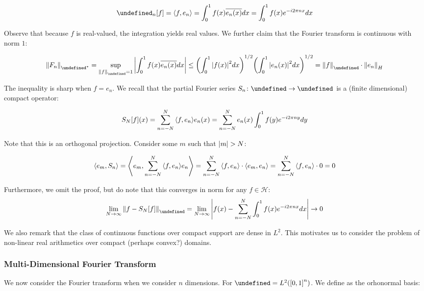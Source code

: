 \documentclass[12pt]{article}
\let\H\undefined
\newcommand{\H}{\mathcal{H}}
\let\F\undefined
\newcommand{\F}{\mathcal{F}}
\begin{document}
\begin{align*}
  \F_n\brackets{f}
    = \inner{f, e_n}
    = \int_0^1 f\parens{x} \overline{e_n \parens{x}} dx
    = \int_0^1 f\parens{x} e^{-i 2 \pi n x} dx
\end{align*}

Observe that because $f$ is real-valued, the integration yields real values.
We further claim that the Fourier transform is continuous with
norm $1$:

\begin{align*}
  \norm{F_n}_{\adj{\H}}
    = \sup_{\norm{f}_{\H} = 1}
        \abs{\int_0^1 f\parens{x} \overline{e_n \parens{x}} dx}
    \leq \parens{\int_0^1 \abs{f\parens{x}}^2 dx}^{1/2}
              \parens{\int_0^1 \abs{e_n \parens{x}}^2 dx}^{1/2}
    = \norm{f}_{\H} \cdot \norm{e_n}_{H}
\end{align*}

The inequality is sharp when $f = e_{n}$.
We recall that the partial Fourier series $\type{S_n}{\H}{\H}$ is a
(finite dimensional) compact operator:

\begin{align*}
  S_N {\left[f\right]} {\left(x\right)}
    = \sum_{n = -N}^{N} {\left\langle f, e_n\right\rangle} e_n {\left(x\right)}
    = \sum_{n = -N}^{N} e_n {\left(x\right)} \int_0^1 f(y) e^{- i 2 \pi n y} dy
\end{align*}

Note that this is an orthogonal projection.
Consider some $m$ such that
${\left\lvert m\right\rvert} > N$:

\begin{align*}
  {\left\langle e_m, S_n\right\rangle}
    = {\left\langle e_m, \sum_{n = -N}^{N} {\left\langle f, e_n\right\rangle} e_n\right\rangle}
    = \sum_{n = -N}^{N} {\left\langle f, e_n\right\rangle} \cdot {\left\langle e_m, e_n\right\rangle}
    = \sum_{n = -N}^{N} {\left\langle f, e_n\right\rangle} \cdot 0
    = 0
\end{align*}

Furthermore, we omit the proof, but do note that this converges in norm
for any $f \in \mathcal{H}$:
\begin{align*}
  \lim_{N \to \infty} \norm{f - S_N \brackets{f}}_{\H}
    = \lim_{N \to \infty}
      \abs{f\parens{x} -
            \sum_{n = -N}^{N} \int_0^1 f\parens{x} e^{-i 2\pi nx} dx}
    \to 0
\end{align*}

We also remark that the class of continuous functions over
compact support are dense in $L^2$.
This motivates us to consider the problem of non-linear real arithmetics
over compact (perhaps convex?) domains.


\subsubsection{Multi-Dimensional Fourier Transform}
We now consider the Fourier transform when we consider $n$ dimensions.
For $\H = L^2 \parens{\brackets{0, 1}^n}$.
We define as the orhonormal basis:
\end{document}
